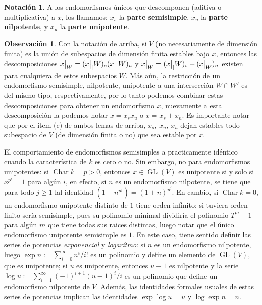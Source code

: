 \documentclass[spanish,10pt]{amsart}
\theoremstyle{definition}
\newtheorem{obs}[theorem]{Observación}
\newtheorem{notation}[theorem]{Notación}
\theoremstyle{remark}
\numberwithin{equation}{section}
\newcommand\rest[2]{{%
  \left.\kern-\nulldelimiterspace %
  #1 %
  \vphantom{\big|} %
  \right|_{#2} %
  }}
\newcommand{\Char}[1]{\operatorname{Char} #1}
\begin{document}
\begin{notation}
A los endomorfismos únicos que descomponen (aditiva o multiplicativa) a $x$, los llamamos: $x_s$ la \textbf{parte semisimple}, $x_n$ la \textbf{parte nilpotente}, y $x_u$ la \textbf{parte unipotente}.
\end{notation}

\begin{obs}
Con la notación de arriba, si $V$ (no necesariamente de dimensión finita) es la unión de subespacios de dimensión finita estables bajo $x$, entonces las descomposiciones $\rest x W = (\rest x | W)_s (\rest x | W)_u$ y $\rest x W = (\rest x | W)_s + (\rest x W)_n$ existen para cualquiera de estos subespacios $W$. Más aún, la restricción de un endomorfismo semisimple, nilpotente, unipotente a una intersección $W \cap W'$ es del mismo tipo, respectivamente, por lo tanto podemos combinar estas descomposiciones para obtener un endomorfismo $x$, nuevamente a esta descomposición la podemos notar $x = x_s x_u$ o $x = x_s + x_n$. Es importante notar que por el ítem (c) de ambos lemas de arriba, $x_s$, $x_n$, $x_u$ dejan estables todo subespacio de $V$ (de dimensión finita o no) que sea estable por $x$.
\end{obs}

El comportamiento de endomorfismos semisimples a practicamente idéntico cuando la característica de $k$ es cero o no. Sin embargo, no para endomorfismos unipotentes: si $\Char k = p > 0$, entonces $x \in \operatorname{GL} (V)$ es unipotente si y solo si $x^{p^i} = 1$ para algún $i$, en efecto, si $n$ es un endomorfismo nilpotente, se tiene que para todo $j \geq 1$ lal identidad $(1+n^{p^j}) = (1 + n)^{p^j}$. En cambio, si $\Char k = 0$,  un endomorfismo unipotente distinto de $1$ tiene orden infinito: si tuviera orden finito sería semisimple, pues su polinomio minimal dividiría el polinomio $T^m - 1$ para algún $m$ que tiene todas sus raices distintas, luego notar que el único endomorfismo unipotente semisimple es $1$. En este caso, tiene sentido definir las series de potencias \textit{exponencial} y \textit{logarítmo}: si $n$ es un endomorfismo nilpotente, luego $\exp n := \sum_{i = 0}^\infty n^i /i!$ es un polinomio y define un elemento de $\operatorname{GL}(V)$, que es unipotente; si $u$ es unipotente, entonces $u-1$ es nilpotente y la serie $\log u := \sum_{i = 1}^\infty (-1)^{i + 1} (u - 1)^i / i$ es un polinomio que define un endomorfismo nilpotente de $V$. Además, las identidades formales usuales de estas series de potencias implican las identidades $\exp \log u = u$ y $\log \exp n = n$.
\end{document}
